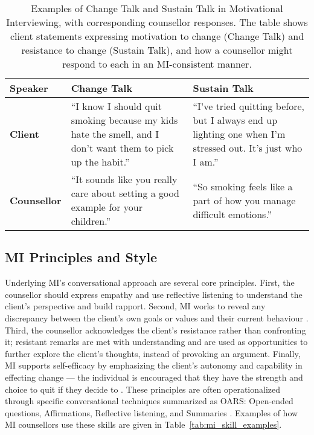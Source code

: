 \begin{table}[ht!]
\centering
\begin{tabular}{@{} p{} p{} p{} @{}}
\toprule
\textbf{Speaker} & \textbf{Change Talk} & \textbf{Sustain Talk} \\
\midrule
\textbf{Client} & 
``I know I should quit smoking because my kids hate the smell, and I don’t want them to pick up the habit.'' & 
``I’ve tried quitting before, but I always end up lighting one when I’m stressed out. It’s just who I am.'' \\
\addlinespace
\textbf{Counsellor} & 
``It sounds like you really care about setting a good example for your children.'' & 
``So smoking feels like a part of how you manage difficult emotions.'' \\
\bottomrule
\end{tabular}
\caption[Examples of Change Talk and Sustain Talk]{Examples of Change Talk and Sustain Talk in Motivational Interviewing, with corresponding counsellor responses. The table shows client statements expressing motivation to change (Change Talk) and resistance to change (Sustain Talk), and how a counsellor might respond to each in an MI-consistent manner.}
\label{tab:change_sustain_talk}
\end{table}



\subsection{MI Principles and Style}
Underlying MI's conversational approach are several core principles. First, the counsellor should express empathy and use reflective listening to understand the client's perspective and build rapport. Second, MI works to reveal any discrepancy between the client's own goals or values and their current behaviour \cite{MillerRollnick2013}. Third, the counsellor acknowledges the client's resistance rather than confronting it; resistant remarks are met with understanding and are used as opportunities to further explore the client's thoughts, instead of provoking an argument. Finally, MI supports self-efficacy by emphasizing the client's autonomy and capability in effecting change --- the individual is encouraged that they have the strength and choice to quit if they decide to \cite{MillerRollnick2013}. These principles are often operationalized through specific conversational techniques summarized as OARS: Open-ended questions, Affirmations, Reflective listening, and Summaries \cite{Rollnick1995}.  Examples of how MI counsellors use these skills are given in Table~\ref{tab:mi_skill_examples}.


